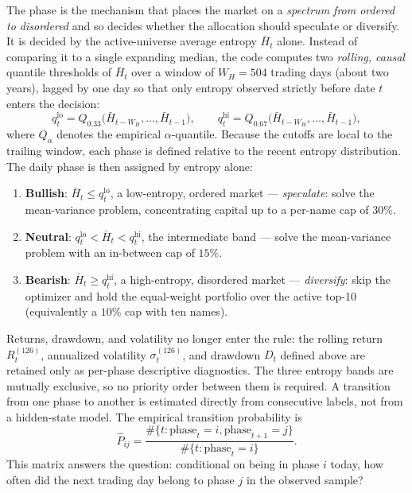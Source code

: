 \documentclass[a4paper,12pt]{article}
\begin{document}
The phase is the mechanism that places the market on a \emph{spectrum from ordered to disordered} and so decides whether the allocation should speculate or diversify. It is decided by the active-universe average entropy $\bar H_t$ alone. Instead of comparing it to a single expanding median, the code computes two \emph{rolling, causal} quantile thresholds of $\bar H_t$ over a window of $W_H=504$ trading days (about two years), lagged by one day so that only entropy observed strictly before date $t$ enters the decision:
\[
q^{\mathrm{lo}}_t=Q_{0.33}\!\big(\bar H_{t-W_H},\ldots,\bar H_{t-1}\big),\qquad
q^{\mathrm{hi}}_t=Q_{0.67}\!\big(\bar H_{t-W_H},\ldots,\bar H_{t-1}\big),
\]
where $Q_\alpha$ denotes the empirical $\alpha$-quantile. Because the cutoffs are local to the trailing window, each phase is defined relative to the recent entropy distribution. The daily phase is then assigned by entropy alone:
\begin{enumerate}[label=\arabic*.]
    \item \textbf{Bullish}: $\bar H_t\leq q^{\mathrm{lo}}_t$, a low-entropy, ordered market --- \emph{speculate}: solve the mean-variance problem, concentrating capital up to a per-name cap of $30\%$.
    \item \textbf{Neutral}: $q^{\mathrm{lo}}_t<\bar H_t<q^{\mathrm{hi}}_t$, the intermediate band --- solve the mean-variance problem with an in-between cap of $15\%$.
    \item \textbf{Bearish}: $\bar H_t\geq q^{\mathrm{hi}}_t$, a high-entropy, disordered market --- \emph{diversify}: skip the optimizer and hold the equal-weight portfolio over the active top-10 (equivalently a $10\%$ cap with ten names).
\end{enumerate}
Returns, drawdown, and volatility no longer enter the rule: the rolling return $R_t^{(126)}$, annualized volatility $\sigma_t^{(126)}$, and drawdown $D_t$ defined above are retained only as per-phase descriptive diagnostics. The three entropy bands are mutually exclusive, so no priority order between them is required. A transition from one phase to another is estimated directly from consecutive labels, not from a hidden-state model. The empirical transition probability is
\[
\widehat{P}_{ij}=
\frac{\#\{t:\mathrm{phase}_t=i,\mathrm{phase}_{t+1}=j\}}
{\#\{t:\mathrm{phase}_t=i\}}.
\]
This matrix answers the question: conditional on being in phase $i$ today, how often did the next trading day belong to phase $j$ in the observed sample?
\end{document}
